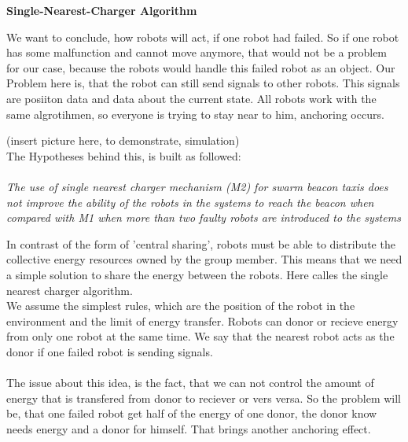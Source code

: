 \documentclass[
	a4paper,
	article,
	pagesize,
	pdftex,
	12pt,
	twoside, %
	BCOR=5mm, %
	english,
	fleqn,
	final,
	]{scrartcl}
\begin{document}
\textbf{Single-Nearest-Charger Algorithm}
\newline

We want to conclude, how robots will act, if one robot had failed. So if one robot has some malfunction and cannot move anymore, that would not be a problem for our case, because the robots would handle this failed robot as an object. Our Problem here is, that the robot can still send signals to other robots. This signals are posiiton data and data about the current state. All robots work with the same algrotihmen, so everyone is trying to stay near to him, anchoring occurs. \newline

(insert picture here, to demonstrate, simulation)
\\

The Hypotheses behind this, is built as followed: 
\\
\\
\textit{The use of single nearest charger mechanism (M2) for swarm beacon
	taxis does not improve the ability of the robots in the systems to
	reach the beacon when compared with M1 when more than two faulty
	robots are introduced to the systems}
\newline

In contrast of the form of 'central sharing', robots must be able to distribute the collective energy resources owned by the group member. This means that we need a simple solution to share the energy between the robots. Here calles the single nearest charger algorithm.
\\
We assume the simplest rules, which are the position of the robot in the environment and the limit of energy transfer. Robots can donor or recieve energy from only one robot at the same time. We say that the nearest robot acts as the donor if one failed robot is sending signals.
\\
\\
The issue about this idea, is the fact, that we can not control the amount of energy that is transfered from donor to reciever or vers versa. So the problem will be, that one failed robot get half of the energy of one donor, the donor know needs energy and a donor for himself. That brings another anchoring effect.
\clearpage
\end{document}
